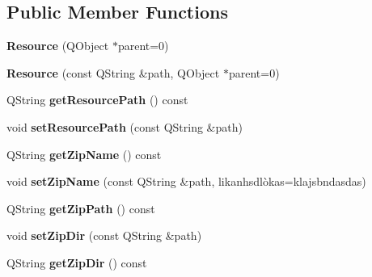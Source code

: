 \subsection*{Public Member Functions}
\begin{DoxyCompactItemize}
\item 
\hypertarget{class_k_cloud_1_1_resource_a3dd2afa53e60ac97f16f50e8f82a7bcd}{{\bfseries Resource} (Q\-Object $\ast$parent=0)}\label{class_k_cloud_1_1_resource_a3dd2afa53e60ac97f16f50e8f82a7bcd}

\item 
\hypertarget{class_k_cloud_1_1_resource_a24579d14126dd79675aa0bef20939564}{{\bfseries Resource} (const Q\-String \&path, Q\-Object $\ast$parent=0)}\label{class_k_cloud_1_1_resource_a24579d14126dd79675aa0bef20939564}

\item 
\hypertarget{class_k_cloud_1_1_resource_abf092ffb39142ff0642768126c709d4d}{Q\-String {\bfseries get\-Resource\-Path} () const }\label{class_k_cloud_1_1_resource_abf092ffb39142ff0642768126c709d4d}

\item 
\hypertarget{class_k_cloud_1_1_resource_af458f276a7b1c0cf5ce4b91da4357079}{void {\bfseries set\-Resource\-Path} (const Q\-String \&path)}\label{class_k_cloud_1_1_resource_af458f276a7b1c0cf5ce4b91da4357079}

\item 
\hypertarget{class_k_cloud_1_1_resource_ab2a8ba8a305e529c3ecb41b00c63b6b2}{Q\-String {\bfseries get\-Zip\-Name} () const }\label{class_k_cloud_1_1_resource_ab2a8ba8a305e529c3ecb41b00c63b6b2}

\item 
\hypertarget{class_k_cloud_1_1_resource_a602610b5af12e6787a74181e5603991b}{void {\bfseries set\-Zip\-Name} (const Q\-String \&path, likanhsdlòkas=klajsbndasdas)}\label{class_k_cloud_1_1_resource_a602610b5af12e6787a74181e5603991b}

\item 
\hypertarget{class_k_cloud_1_1_resource_ada28810269938beecba3b620f84ead30}{Q\-String {\bfseries get\-Zip\-Path} () const }\label{class_k_cloud_1_1_resource_ada28810269938beecba3b620f84ead30}

\item 
\hypertarget{class_k_cloud_1_1_resource_aa3a48fa700a7ccdc191ed3f81abf5b79}{void {\bfseries set\-Zip\-Dir} (const Q\-String \&path)}\label{class_k_cloud_1_1_resource_aa3a48fa700a7ccdc191ed3f81abf5b79}

\item 
\hypertarget{class_k_cloud_1_1_resource_a57916e04bcb13b6ffec61160140c4dc3}{Q\-String {\bfseries get\-Zip\-Dir} () const }\label{class_k_cloud_1_1_resource_a57916e04bcb13b6ffec61160140c4dc3}


\end{DoxyCompactItemize}
